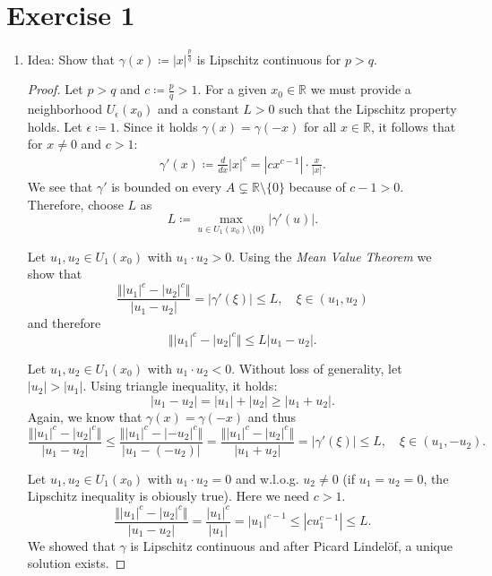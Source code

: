 \documentclass{article}
\theoremstyle{named}
\begin{document}
	
	\section*{Exercise 1}
	\begin{enumerate}[label=(\roman*)]
		\item Idea: Show that $\gamma(x) \coloneqq |x|^{\frac{p}{q}}$ is Lipschitz continuous for $p > q$. 
		\begin{proof}
			Let $p > q$ and $c \coloneqq \frac{p}{q} > 1$. For a given $x_0 \in \mathbb R$ we must provide a neighborhood $U_{\epsilon}(x_0)$ and a constant $L >0$ such that the Lipschitz property holds. Let $\epsilon \coloneqq 1$. Since it holds $\gamma(x) = \gamma(-x)$ for all $x \in \mathbb R$,  it follows that for $x \neq 0$ and $c>1$:
			\begin{align}
			\gamma'(x) \coloneqq \frac{d}{dx}|x|^{c} = |cx^{c-1}| \cdot \frac{x}{|x|}.
			\end{align}
			We see that $\gamma'$ is bounded on every $A \subsetneq \mathbb R \setminus \{0\}$ because of $c-1 > 0$. Therefore, choose $L$ as 
			\[
			L \coloneqq \max_{u \in U_1(x_0) \setminus\{0\}} |\gamma'(u)|.
			\]
			
			Let $u_1, u_2 \in U_1(x_0)$ with $u_1 \cdot u_2 > 0$. Using the \emph{Mean Value Theorem} we show that
			\[
			\frac{\Vert |u_1|^c -|u_2|^c \Vert}{|u_1-u_2|} = |\gamma'(\xi)| \leq L, \quad \xi \in (u_1,u_2)
			\]
			and therefore
			\[
			\Vert |u_1|^c -|u_2|^c \Vert \leq L|u_1-u_2|.
			\]
			
			Let $u_1, u_2 \in U_1(x_0)$ with $u_1 \cdot u_2 < 0$.  Without loss of generality, let $|u_2| > |u_1|$. Using triangle inequality, it holds: 
			\[
			|u_1-u_2| = |u_1| + |u_2| \geq |u_1 + u_2|.
			\]
			Again, we know that $\gamma(x) = \gamma(-x)$ and thus
			\[
			\frac{\Vert |u_1|^c -|u_2|^c \Vert}{|u_1-u_2|} \leq \frac{\Vert |u_1|^c -|-u_2|^c \Vert}{|u_1-(-u_2)|} = \frac{\Vert |u_1|^c -|u_2|^c \Vert}{|u_1+u_2|} = |\gamma'(\xi)| \leq L, \quad \xi \in (u_1, -u_2).
			\]
			
			Let $u_1, u_2 \in U_1(x_0)$ with $u_1 \cdot u_2 = 0$ and w.l.o.g. $u_2 \neq 0$ (if $u_1 = u_2 = 0$, the Lipschitz inequality is obiously true). Here we need $c>1$. 
			\[
			\frac{\Vert |u_1|^c -|u_2|^c \Vert}{|u_1-u_2|} = \frac{ |u_1|^c }{|u_1|} = |u_1|^{c-1} \leq |cu_1^{c-1}| \leq L.
			\]
			We showed that $\gamma$ is Lipschitz continuous and after Picard Lindelöf, a unique solution exists.
		\end{proof}
		

\end{enumerate}
\end{document}
